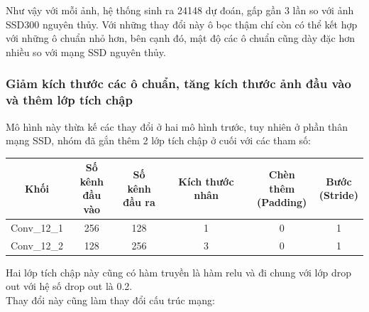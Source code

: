 \documentclass[a4paper,12pt]{article}
\begin{document}
	Như vậy với mỗi ảnh, hệ thống sinh ra 24148 dự đoán, gấp gần 3 lần so với ảnh SSD300 nguyên thủy. Với những thay đổi này ô bọc thậm chí còn có thể kết hợp với những ô chuẩn nhỏ hơn, bên cạnh đó, mật độ các ô chuẩn cũng dày đặc hơn nhiều so với mạng SSD nguyên thủy.
	
	\subsubsection*{Giảm kích thước các ô chuẩn, tăng kích thước ảnh đầu vào và thêm lớp tích chập}
	
	Mô hình này thừa kế các thay đổi ở hai mô hình trước, tuy nhiên ở phần thân mạng SSD, nhóm đã gắn thêm 2 lớp tích chập ở cuối với các tham số: \\
	
	\begin{center}
		\begin{tabular}{||c | c | c | c | c | c ||} 
			\hline
			Khối & \makecell{ Số kênh \\ đầu vào } & \makecell{ Số kênh \\ đầu ra} & Kích thước nhân &  \makecell{ Chèn thêm \\ (Padding) } &  \makecell{ Bước \\ (Stride) } \\ [0.5ex] 
			\hline\hline
			Conv\_12\_1 & 256 & 128 & 1 & 0 & 1 \\ 
			\hline
			Conv\_12\_2 & 128 & 256 & 3 & 0 & 1 \\ 
			\hline
		\end{tabular}
	\end{center}
	Hai lớp tích chập này cũng có hàm truyền là hàm relu và đi chung với lớp drop out với hệ số drop out là 0.2. \\
	
	Thay đổi này cũng làm thay đổi cấu trúc mạng:
	
\end{document}
